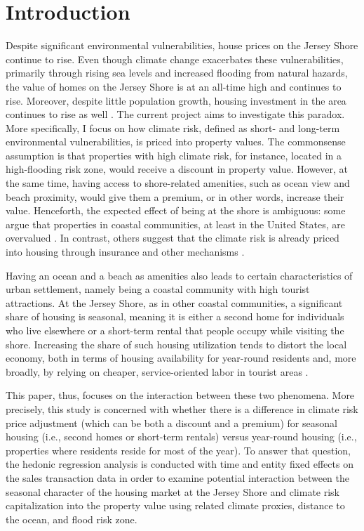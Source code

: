 \documentclass[11pt]{article}
\begin{document}
\section{Introduction}

Despite significant environmental vulnerabilities, house prices on the Jersey Shore continue to rise. Even though climate change exacerbates these vulnerabilities, primarily through rising sea levels and increased flooding from natural hazards, the value of homes on the Jersey Shore is at an all-time high and continues to rise. Moreover, despite little population growth, housing investment in the area continues to rise as well \parencite{andrews2025-PersistingJerseyShore}. The current project aims to investigate this paradox. More specifically, I focus on how climate risk, defined as short- and long-term environmental vulnerabilities, is priced into property values. The commonsense assumption is that properties with high climate risk, for instance, located in a high-flooding risk zone, would receive a discount in property value. However, at the same time, having access to shore-related amenities, such as ocean view and beach proximity, would give them a premium, or in other words, increase their value. Henceforth, the expected effect of being at the shore is ambiguous: some argue that properties in coastal communities, at least in the United States, are overvalued \parencite{gourevitchetal2023-UnpricedClimateRisk,hinoburke2020-DoesInformationClimate}. In contrast, others suggest that the climate risk is already priced into housing through insurance and other mechanisms \parencite{coxetal2025-ChangingUrbanRiskscapes,colliercox2021-GoverningUrbanResilience}. 

Having an ocean and a beach as amenities also leads to certain characteristics of urban settlement, namely being a coastal community with high tourist attractions. At the Jersey Shore, as in other coastal communities, a significant share of housing is seasonal, meaning it is either a second home for individuals who live elsewhere or a short-term rental that people occupy while visiting the shore. Increasing the share of such housing utilization tends to distort the local economy, both in terms of housing availability for year-round residents and, more broadly, by relying on cheaper, service-oriented labor in tourist areas \parencite{wassmer2022-ValueProximityVacation}.

This paper, thus, focuses on the interaction between these two phenomena. More precisely, this study is concerned with whether there is a difference in climate risk price adjustment (which can be both a discount and a premium) for seasonal housing (i.e., second homes or short-term rentals) versus year-round housing (i.e., properties where residents reside for most of the year). To answer that question, the hedonic regression analysis is conducted with time and entity fixed effects on the sales transaction data in order to examine potential interaction between the seasonal character of the housing market at the Jersey Shore and climate risk capitalization into the property value using related climate proxies, distance to the ocean, and flood risk zone.
\end{document}
